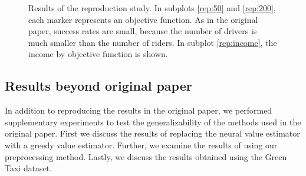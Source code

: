 \begin{figure}[H]
\centering
\captionsetup{justification=centering}
\caption{Results of the reproduction study. In subplots \ref{rep:50} and \ref{rep:200}, each marker represents an objective function. As in the original paper, success rates are small, because the number of drivers is much smaller than the number of riders. In subplot \ref{rep:income}, the income by objective function is shown.}
\label{success_rates_orig}
\end{figure}

\subsection{Results beyond original paper}
In addition to reproducing the results in the original paper, we performed supplementary experiments to test the generalizability of the methods used in the original paper. First we discuss the results of replacing the neural value estimator with a greedy value estimator. Further, we examine the results of using our preprocessing method. Lastly, we discuss the results obtained using the Green Taxi dataset.

